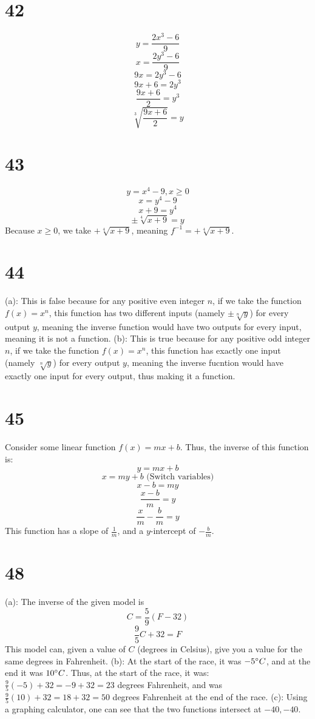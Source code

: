 \documentclass{article}
\theoremstyle{definition}
\begin{document}
\section*{42}
\[ y=\frac{2x^3-6}{9} \]
\[ x=\frac{2y^3-6}{9} \]
\[ 9x=2y^3-6 \]
\[ 9x+6=2y^3 \]
\[ \frac{9x+6}{2}=y^3 \]
\[ \sqrt[3]{\frac{9x+6}{2}}=y \]

\section*{43}
\[ y=x^4-9,x\ge 0 \]
\[ x=y^4-9 \]
\[ x+9=y^4 \]
\[ \pm\sqrt[4]{x+9}=y \]
Because $x\ge 0$, we take $+\sqrt[4]{x+9}$, meaning $f^{-1}=+\sqrt[4]{x+9}$.

\section*{44}
(a): This is false because for any positive even integer $n$, if we take the function $f(x)=x^n$, this function has two different inputs 
(namely $\pm\sqrt[n]{y}$) for every output $y$, meaning the inverse function would have two outputs for every input, meaning it is not a function.\newline
(b): This is true because for any positive odd integer $n$, if we take the function $f(x)=x^n$, this function has exactly one input  
(namely $\sqrt[n]{y}$) for every output $y$, meaning the inverse fucntion would have exactly one input for every output, thus making it a function.

\section*{45}
Consider some linear function $f(x)=mx+b$. Thus, the inverse of this function is:
\[ y=mx+b \]
\[ x=my+b \textrm{ (Switch variables)} \]
\[ x-b=my \]
\[ \frac{x-b}{m}=y \]
\[ \frac{x}{m}-\frac{b}{m}=y \]
This function has a slope of $\frac{1}{m}$, and a $y$-intercept of $-\frac{b}{m}$.

\section*{48}
(a): The inverse of the given model is
\[ C=\frac{5}{9}(F-32) \]
\[ \frac{9}{5}C+32=F \]
This model can, given a value of $C$ (degrees in Celsius), give you a value for the same degrees in Fahrenheit.\newline
(b): At the start of the race, it was $-5\degree C$, and at the end it was $10\degree C$. Thus, at the start of the race, it was: 
$\frac{9}{5}(-5)+32=-9+32=23$ degrees Fahrenheit, and was $\frac{9}{5}(10)+32=18+32=50$ degrees Fahrenheit at the end of the race.\newline
(c): Using a graphing calculator, one can see that the two functions intersect at $-40,-40$.
\end{document}
